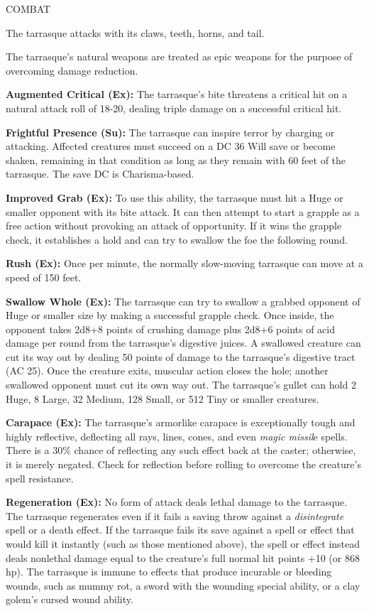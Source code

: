 \documentclass{article}
\begin{document}
COMBAT

The tarrasque attacks with its claws, teeth, horns, and tail.

The tarrasque's natural weapons are treated as epic weapons for the purpose of 
overcoming damage reduction.

\textbf{Augmented Critical (Ex):} The tarrasque's bite threatens a critical hit 
on a natural attack roll of 18-20, dealing triple damage on a successful critical 
hit.

\textbf{Frightful Presence (Su):} The tarrasque can inspire terror by charging 
or attacking. Affected creatures must succeed on a DC 36 Will save or become shaken, 
remaining in that condition as long as they remain with 60 feet of the tarrasque. 
The save DC is Charisma-based.

\textbf{Improved Grab (Ex):} To use this ability, the tarrasque must hit a Huge 
or smaller opponent with its bite attack. It can then attempt to start a grapple 
as a free action without provoking an attack of opportunity. If it wins the grapple 
check, it establishes a hold and can try to swallow the foe the following round.

\textbf{Rush (Ex):} Once per minute, the normally slow-moving tarrasque can move 
at a speed of 150 feet. 

\textbf{Swallow Whole (Ex):} The tarrasque can try to swallow a grabbed opponent 
of Huge or smaller size by making a successful grapple check. Once inside, the 
opponent takes 2d8+8 points of crushing damage plus 2d8+6 points of acid damage 
per round from the tarrasque's digestive juices. A swallowed creature can cut its 
way out by dealing 50 points of damage to the tarrasque's digestive tract (AC 25). 
Once the creature exits, muscular action closes the hole; another swallowed opponent 
must cut its own way out. The tarrasque's gullet can hold 2 Huge, 8 Large, 32 Medium, 
128 Small, or 512 Tiny or smaller creatures. 

\textbf{Carapace (Ex):} The tarrasque's armorlike carapace is exceptionally tough 
and highly reflective, deflecting all rays, lines, cones, and even \textit{magic 
missil}e spells. There is a 30\% chance of reflecting any such effect back at the 
caster; otherwise, it is merely negated. Check for reflection before rolling to 
overcome the creature's spell resistance.

\textbf{Regeneration (Ex): }No form of attack deals lethal damage to the tarrasque. 
The tarrasque regenerates even if it fails a saving throw against a \textit{disintegrate 
}spell or a death effect. If the tarrasque fails its save against a spell or effect 
that would kill it instantly (such as those mentioned above), the spell or effect 
instead deals nonlethal damage equal to the creature's full normal hit points +10 
(or 868 hp). The tarrasque is immune to effects that produce incurable or bleeding 
wounds, such as mummy rot, a sword with the wounding special ability, or a clay 
golem's cursed wound ability.
\end{document}
